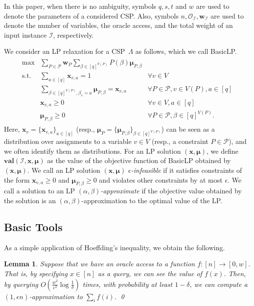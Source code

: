 \documentclass[letterpaper, 11pt]{article}
\newtheorem{lemma}[theorem]{Lemma}
\newcommand{\calI}{\mathcal{I}}
\newcommand{\calO}{\mathcal{O}}
\newcommand{\calP}{\mathcal{P}}
\newcommand{\biw}{\boldsymbol{w}}
\newcommand{\bix}{\boldsymbol{x}}
\newcommand{\bimu}{\boldsymbol{\mu}}
\newcommand{\blp}{\textsf{BasicLP}\xspace}
\newcommand{\val}{\mathbf{val}}
\begin{document}
In this paper, when there is no ambiguity,
symbols $q,s,t$ and $w$ are used to denote the parameters of a considered CSP.
Also, symbols $n,\calO_{\calI},\biw_{\calI}$ are used to denote the number of variables, the oracle access, and the total weight of an input instance $\calI$, respectively.

We consider an LP relaxation for a CSP~$\Lambda$ as follows, which we call \blp.
\begin{eqnarray*}
  \begin{array}{lll}
    \max & \sum\limits_{P\in \calP}\biw_P \sum\limits_{\beta \in [q]^{V(P)}}P(\beta)\bimu_{P,\beta}\\  
    \mbox{s.t.} & \sum\limits_{a\in [q]}\bix_{v,a}=1 & \forall v \in V\\    
    & \sum\limits_{\beta \in [q]^{V(P)}, \beta_v=a}\bimu_{P,\beta}=\bix_{v,a} & \forall P\in \calP, v \in V(P), a\in [q]\\
    & \bix_{v,a}\geq 0 & \forall v \in V, a\in [q]\\
    & \bimu_{P,\beta}\geq 0 & \forall P\in \calP, \beta\in [q]^{V(P)}.
  \end{array}
\end{eqnarray*}
Here, $\bix_{v}=\{\bix_{v,a}\}_{a\in [q]}$ (resp., $\bimu_P=\{\bimu_{P,\beta}\}_{\beta\in [q]^{V(P)}}$) can be seen as a distribution over assignments to a variable $v\in V$ (resp., a constraint $P\in \calP$), 
and we often identify them as distributions.
For an LP solution $(\bix,\bimu)$,
we define $\val(\calI,\bix,\bimu)$ as the value of the objective function of \blp obtained by $(\bix,\bimu)$.
We call an LP solution $(\bix,\bimu)$ \textit{$\epsilon$-infeasible} if it satisfies constraints of the form $\bix_{v,a}\geq 0$ and $\bimu_{P,\beta}\geq 0$ and violates other constraints by at most $\epsilon$.
We call a solution to an LP \textit{$(\alpha,\beta)$-approximate} if the objective value obtained by the solution is an $(\alpha,\beta)$-approximation to the optimal value of the LP.

\subsection{Basic Tools}

As a simple application of Hoeffding's inequality, we obtain the following.
\begin{lemma}\label{lmm:stat}
  Suppose that we have an oracle access to a function $f:[n]\to [0,w]$.
  That is, by specifying $x\in [n]$ as a query, 
  we can see the value of $f(x)$.
  Then, by querying $O(\frac{w^2}{\epsilon^2}\log \frac{1}{\delta})$ times, 
  with probability at least $1-\delta$, 
  we can compute a $(1,\epsilon n)$-approximation to $\sum_i f(i)$.
  \qed
\end{lemma}
\end{document}
